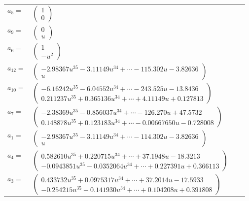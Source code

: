 \documentclass[1p]{elsarticle_modified}
\theoremstyle{definition}
\begin{document}
\begin{tabular}{m{7pt} m{180pt} m{7pt} m{180pt} }
\flushright $a_{5}=$&$\begin{pmatrix}1\\0\end{pmatrix}$ \\
\flushright $a_{9}=$&$\begin{pmatrix}0\\u\end{pmatrix}$ \\
\flushright $a_{6}=$&$\begin{pmatrix}1\\- u^2\end{pmatrix}$ \\
\flushright $a_{12}=$&$\begin{pmatrix}-2.98367 u^{35}-3.11149 u^{34}+\cdots-115.302 u-3.82636\\u\end{pmatrix}$ \\
\flushright $a_{10}=$&$\begin{pmatrix}-6.16242 u^{35}-6.04552 u^{34}+\cdots-243.525 u-13.8436\\0.211237 u^{35}+0.365136 u^{34}+\cdots+4.11149 u+0.127813\end{pmatrix}$ \\
\flushright $a_{7}=$&$\begin{pmatrix}-2.38369 u^{35}-0.856037 u^{34}+\cdots-126.270 u+47.5732\\0.148878 u^{35}+0.123183 u^{34}+\cdots-0.00667650 u-0.728008\end{pmatrix}$ \\
\flushright $a_{1}=$&$\begin{pmatrix}-2.98367 u^{35}-3.11149 u^{34}+\cdots-114.302 u-3.82636\\u\end{pmatrix}$ \\
\flushright $a_{4}=$&$\begin{pmatrix}0.582610 u^{35}+0.220715 u^{34}+\cdots+37.1948 u-18.3213\\-0.0943851 u^{35}-0.0352064 u^{34}+\cdots+0.227391 u+0.366113\end{pmatrix}$ \\
\flushright $a_{3}=$&$\begin{pmatrix}0.433732 u^{35}+0.0975317 u^{34}+\cdots+37.2014 u-17.5933\\-0.254215 u^{35}-0.141930 u^{34}+\cdots+0.104208 u+0.391808\end{pmatrix}$ \\

\end{tabular}
\end{document}
